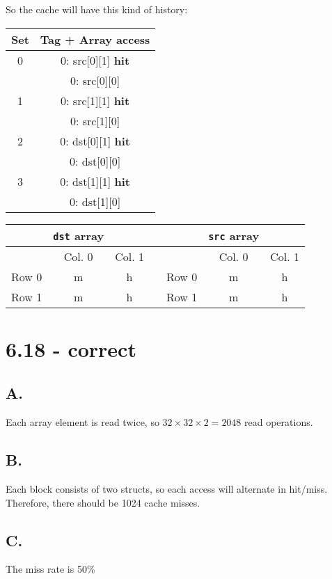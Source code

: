 \documentclass{article}
\begin{document}
\noindent So the cache will have this kind of history:
\begin{center}
    \begin{tabular}{|c|c|}
        \hline
        Set & Tag + Array access \\
        \hline
        0 & 0: src[0][1] \textbf{hit} \\
        & 0: src[0][0] \\
        \hline
        1 & 0: src[1][1] \textbf{hit} \\

        & 0: src[1][0] \\
        \hline
        2 & 0: dst[0][1] \textbf{hit} \\

        & 0: dst[0][0] \\
        \hline
        3 & 0: dst[1][1] \textbf{hit} \\

        & 0: dst[1][0] \\
        \hline
    \end{tabular}
\end{center}

\begin{center}
    \begin{tabular}{l c c c l c c}
        & \texttt{dst} array & & \quad & & \texttt{src} array & \\
        \hline
        & Col. 0 & Col. 1 & & & Col. 0 & Col. 1 \\
        \hline
        Row 0 & m & h & & Row 0 & m & h \\
        Row 1 & m & h & & Row 1 & m & h \\
    \end{tabular}
\end{center}

\section*{6.18 - correct}

\subsection*{A.}
Each array element is read twice, so $32 \times 32 \times 2 = 2048$ read operations.

\subsection*{B.}
Each block consists of two structs, so each access will alternate in hit/miss.
Therefore, there should be 1024 cache misses.

\subsection*{C.}
The miss rate is 50\%
\end{document}
